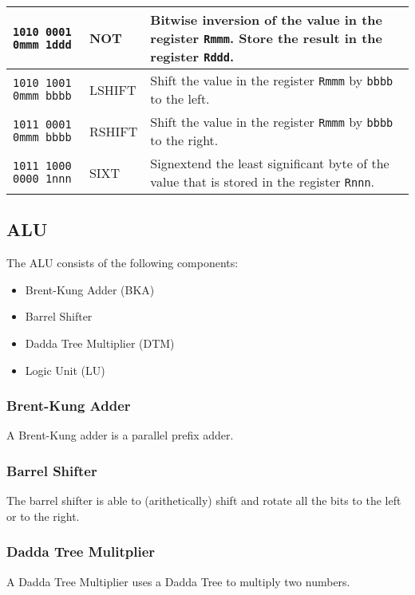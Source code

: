 \documentclass[twoside]{article}
\begin{document}
\begin{table}[H]
\begin{longtable}{m{}m{}m{}}
                                                    \hline
                                                    \bigstrut
        \texttt{1010 0001 0mmm 1ddd} & NOT       & Bitwise inversion of the value in
                                                    the register \texttt{Rmmm}. Store
                                                    the result in the register
                                                    \texttt{Rddd}.\\
                                                    \hline
                                                    \bigstrut
        \texttt{1010 1001 0mmm bbbb} & LSHIFT    & Shift the value in the register
                                                    \texttt{Rmmm} by \texttt{bbbb} to
                                                    the left.\\
                                                    \hline
                                                    \bigstrut
        \texttt{1011 0001 0mmm bbbb} & RSHIFT    & Shift the value in the register
                                                    \texttt{Rmmm} by \texttt{bbbb} to
                                                    the right.\\
                                                    \hline
                                                    \bigstrut
        \texttt{1011 1000 0000 1nnn} & SIXT      & Signextend the least significant
                                                    byte of the value that is stored
                                                    in the register \texttt{Rnnn}.\\
                                                    \hline
    \end{longtable}
\end{table}

\subsection*{ALU}
The ALU consists of the following components:
\begin{itemize}
    \item Brent-Kung Adder (BKA)
    \item Barrel Shifter
    \item Dadda Tree Multiplier (DTM)
    \item Logic Unit (LU)
\end{itemize}

\subsubsection*{Brent-Kung Adder}
A Brent-Kung adder is a parallel prefix adder.

\subsubsection*{Barrel Shifter}
The barrel shifter is able to (arithetically) shift and rotate all the bits
to the left or to the right.

\subsubsection*{Dadda Tree Mulitplier}
A Dadda Tree Multiplier uses a Dadda Tree to multiply two numbers.
\end{document}
